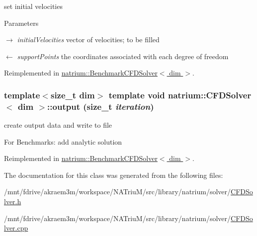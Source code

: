 set initial velocities 
\begin{DoxyParams}{Parameters}
\item[\mbox{$\rightarrow$} {\em initialVelocities}]vector of velocities; to be filled \item[\mbox{$\leftarrow$} {\em supportPoints}]the coordinates associated with each degree of freedom \end{DoxyParams}


Reimplemented in \hyperlink{classnatrium_1_1BenchmarkCFDSolver_a7883dcfd4469ae65ae62cad09ae5d160}{natrium::BenchmarkCFDSolver$<$ dim $>$}.\hypertarget{classnatrium_1_1CFDSolver_abf6804f132885502b61877fc1f9ca4a2}{
\subsubsection[{output}]{\setlength{\rightskip}{0pt plus 5cm}template$<$size\_\-t dim$>$ template void {\bf natrium::CFDSolver}$<$ dim $>$::output (size\_\-t {\em iteration})}}
\label{classnatrium_1_1CFDSolver_abf6804f132885502b61877fc1f9ca4a2}


create output data and write to file 

For Benchmarks: add analytic solution 

Reimplemented in \hyperlink{classnatrium_1_1BenchmarkCFDSolver_a9708132fc0cef4ae55e3453672891c81}{natrium::BenchmarkCFDSolver$<$ dim $>$}.

The documentation for this class was generated from the following files:\begin{DoxyCompactItemize}
\item 
/mnt/fdrive/akraem3m/workspace/NATriuM/src/library/natrium/solver/\hyperlink{CFDSolver_8h}{CFDSolver.h}\item 
/mnt/fdrive/akraem3m/workspace/NATriuM/src/library/natrium/solver/\hyperlink{CFDSolver_8cpp}{CFDSolver.cpp}\end{DoxyCompactItemize}
